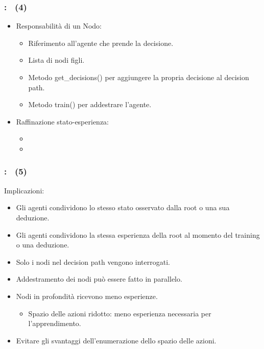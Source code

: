 \documentclass[compress]{beamer}
\begin{document}
\begin{frame}
    \frametitle{\subsecname: \subsubsecname\ (4)}
    \begin{itemize}
        \item Responsabilità di un Nodo:
        \begin{itemize}
            \item Riferimento all'agente che prende la decisione.
            \item Lista di nodi figli.
            \item Metodo get\_decisions() per aggiungere la propria decisione al decision path.
            \item Metodo train() per addestrare l'agente.
        \end{itemize}
        \item Raffinazione stato-esperienza:
        \begin{itemize}
            \item {}
            \item {}
        \end{itemize}
    \end{itemize}
\end{frame}

\begin{frame}
    \frametitle{\subsecname: \subsubsecname\ (5)}
    Implicazioni:
    \begin{itemize}
        \item Gli agenti condividono lo stesso stato osservato dalla root o una sua deduzione.
        \item Gli agenti condividono la stessa esperienza della root al momento del training o una deduzione.
        \item Solo i nodi nel decision path vengono interrogati.
        \item Addestramento dei nodi può essere fatto in parallelo.
        \item Nodi in profondità ricevono meno esperienze.
        \begin{itemize}
            \item Spazio delle azioni ridotto: meno esperienza necessaria per l'apprendimento.
        \end{itemize}
        \item Evitare gli svantaggi dell'enumerazione dello spazio delle azioni.
    \end{itemize}
\end{frame}
\end{document}
